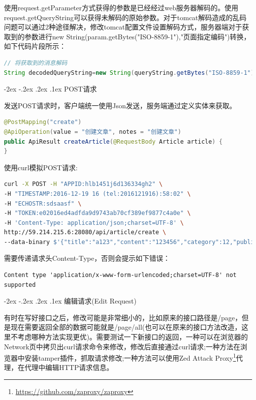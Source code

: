 \documentclass[12pt]{book}
\makeatletter
\numberwithin{dummy}{section}
\theoremstyle{ocrenumbox}
\theoremstyle{blacknumex}
\theoremstyle{blacknumbox}
\theoremstyle{ocrenum}
\renewcommand\paragraph{\@startsection{paragraph}{4}{\z@}
	{-2ex \@plus-.2ex \@minus .2ex}
	{.1ex}
	{\normalfont\small\sffamily\bfseries}}
\makeatother
\begin{document}
使用request.getParameter方式获得的参数是已经经过web服务器解码的。使用request.getQueryString可以获得未解码的原始参数。对于tomcat解码造成的乱码问题可以通过2种途径解决，修改tomcat配置文件设置解码方式，服务器端对于获取到的参数进行new String(param.getBytes("ISO-8859-1"),"页面指定编码")转换，如下代码片段所示：

\begin{lstlisting}[language=Java]
// 将获取到的消息解码
String decodedQueryString=new String(queryString.getBytes("ISO-8859-1"),"UTF-8");
\end{lstlisting}

\paragraph{POST请求}

发送POST请求时，客户端统一使用Json发送，服务端通过定义实体来获取。

\begin{lstlisting}[language=Java]
@PostMapping("create")
@ApiOperation(value = "创建文章", notes = "创建文章")
public ApiResult createArticle(@RequestBody Article article) {
}
\end{lstlisting}

使用curl模拟POST请求:

\begin{lstlisting}[language=Bash]
curl -X POST -H "APPID:hlb1451j6d136334gh2" \
-H "TIMESTAMP:2016-12-19 16 (tel:2016121916):58:02" \
-H "ECHOSTR:sdsaasf" \
-H "TOKEN:e02016ed4adfda9d9743ab70cf389ef9877c4a0e" \
-H 'Content-Type: application/json;charset=UTF-8' \
http://59.214.215.6:28080/api/article/create \
--data-binary $'{"title":"a123","content":"123456","category":12,"publisher":"ab"}'|jq '.'
\end{lstlisting}

需要传递请求头Content-Type，否则会提示如下错误：

\begin{lstlisting}
Content type 'application/x-www-form-urlencoded;charset=UTF-8' not supported
\end{lstlisting}

\paragraph{编辑请求(Edit Request)}

有时在写好接口之后，修改可能是非常细小的，比如原来的接口路径是/page，但是现在需要返回全部的数据可能就是/page/all(也可以在原来的接口方法改造，这里不考虑哪种方法实现更优)。需要测试一下新接口的返回，一种可以在浏览器的Network页中拷贝出curl请求命令来修改，修改后直接通过curl请求;一种方法在浏览器中安装tamper插件，抓取请求修改;一种方法可以使用Zed Attack Proxy\footnote{\url{https://github.com/zaproxy/zaproxy}}代理，在代理中编辑HTTP请求信息。
\end{document}
